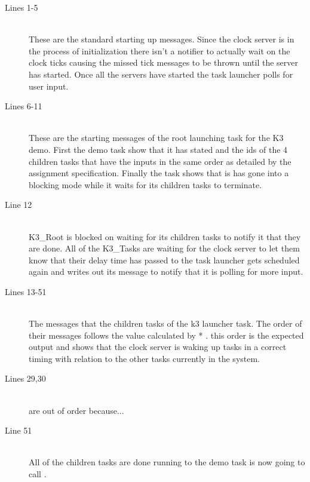 \documentclass[pdftex,10pt,a4paper]{article}
\begin{document}
\newpage
\begin{description}
\item[Lines 1-5] \hfill \\
These are the standard starting up messages. Since the clock server is in the 
process of initialization there isn't a notifier to actually wait on the clock
ticks causing the missed tick messages to be thrown until the server has
started. Once all the servers have started the task launcher polls for user
input.

\item[Lines 6-11] \hfill \\
These are the starting messages of the root launching task for the K3 demo.
First the demo task show that it has stated and the ids of the 4 children
tasks that have the inputs in the same order as detailed by the assignment
specification. Finally the task shows that is has gone into a blocking mode
while it waits for its children tasks to terminate.

\item[Line 12] \hfill \\
K3\_Root is blocked on waiting for its children tasks to notify it that they
are done. All of the K3\_Tasks are waiting for the clock server to let them
know that their delay time has passed to the task launcher gets scheduled again
and writes out its message to notify that it is polling for more input.

\item[Lines 13-51] \hfill \\
The messages that the children tasks of the k3 launcher task. The order of
their messages follows the value calculated by  * . this
order is the expected output and shows that the clock server is waking up tasks
in a correct timing with relation to the other tasks currently in the system.

\item[Lines 29,30] \hfill \\
are out of order because...

\item[Line 51] \hfill \\
All of the children tasks are done running to the demo task is now going to call
.

\end{description}
\end{document}
